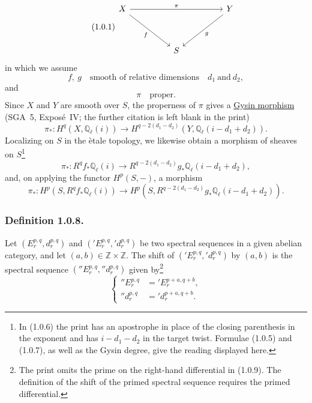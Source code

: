 \begin{equation}\tag{1.0.1}
\begin{tikzcd}[column sep=huge, row sep=huge]
X \arrow[rr, "\pi"] \arrow[dr, "f"'] & {} & Y \arrow[dl, "g"] \\
{} & S & {}
\end{tikzcd}
\end{equation}
in which we assume
\begin{equation}\tag{1.0.3}
f,\ g \quad\text{smooth of relative dimensions}\quad d_1\ \text{and}\ d_2,
\end{equation}
and
\begin{equation}\tag{1.0.4}
\pi\quad\text{proper}.
\end{equation}
Since $X$ and $Y$ are smooth over $S$, the properness of $\pi$ gives a
\underline{Gysin morphism} (SGA~5, Expos\'e~IV; the further citation is left
blank in the print)
\begin{equation}\tag{1.0.5}
\pi_*:H^q(X,\mathbb Q_\ell(i))\longrightarrow
H^{q-2(d_1-d_2)}(Y,\mathbb Q_\ell(i-d_1+d_2)).
\end{equation}
Localizing on $S$ in the \`etale topology, we likewise obtain a morphism of
sheaves on $S$\footnote{In (1.0.6) the print has an apostrophe in place of
the closing parenthesis in the exponent and has $i-d_1-d_2$ in the target
twist.  Formulae (1.0.5) and (1.0.7), as well as the Gysin degree, give the
reading displayed here.}
\begin{equation}\tag{1.0.6}
\pi_*:R^qf_*\mathbb Q_\ell(i)\longrightarrow
R^{q-2(d_1-d_2)}g_*\mathbb Q_\ell(i-d_1+d_2),
\end{equation}
and, on applying the functor $H^p(S,-)$, a morphism
\begin{equation}\tag{1.0.7}
\pi_*:H^p(S,R^qf_*\mathbb Q_\ell(i))\longrightarrow
H^p(S,R^{q-2(d_1-d_2)}g_*\mathbb Q_\ell(i-d_1+d_2)).
\end{equation}

\subsubsection*{Definition 1.0.8.}
Let $(E_r^{p,q},d_r^{p,q})$ and
$({}'E_r^{p,q},{}'d_r^{p,q})$ be two spectral sequences in a given abelian
category, and let $(a,b)\in\mathbb Z\times\mathbb Z$.  The shift of
$({}'E_r^{p,q},{}'d_r^{p,q})$ by $(a,b)$ is the spectral sequence
$({}''E_r^{p,q},{}''d_r^{p,q})$ given by\footnote{The print omits the prime
on the right-hand differential in (1.0.9).  The definition of the shift of
the primed spectral sequence requires the primed differential.}
\begin{equation}\tag{1.0.9}
\left\{
\begin{aligned}
{}''E_r^{p,q}&={}'E_r^{p+a,q+b},\\
{}''d_r^{p,q}&={}'d_r^{p+a,q+b}.
\end{aligned}
\right.
\end{equation}

